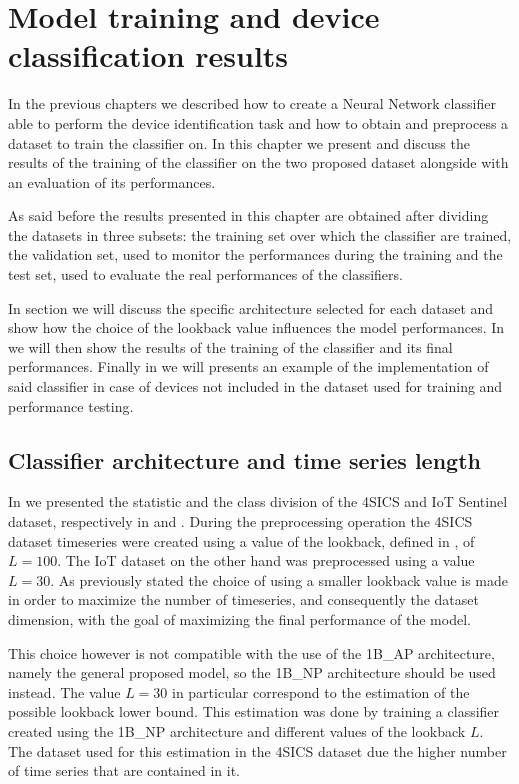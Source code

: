 \chapter{Model training and device classification results}

In the previous chapters we described how to create a Neural Network classifier able to perform the device identification task and how to obtain and preprocess a dataset to train the classifier on. In this chapter we present and discuss the results of the training of the classifier on the two proposed dataset alongside with an evaluation of its performances.

As said before the results presented in this chapter are obtained after dividing the datasets in three subsets: the training set over which the classifier are trained, the validation set, used to monitor the performances during the training and the test set, used to evaluate the real performances of the classifiers.

In section  we will discuss the specific architecture selected for each dataset and show how the choice of the lookback value influences the model performances. In  we will then show the results of the training of the classifier and its final performances. Finally in  we will presents an example of the implementation of said classifier in case of devices not included in the dataset used for training and performance testing.

\section{Classifier architecture and time series length}\label{res_lb}

In  we presented the statistic and the class division of the 4SICS and IoT Sentinel dataset, respectively in  and . During the preprocessing operation the 4SICS dataset timeseries were created using a value of the lookback, defined in , of $L=100$. The IoT dataset on the other hand was preprocessed using a value $L=30$. As previously stated the choice of using a smaller lookback value is made in order to maximize the number of timeseries, and consequently the dataset dimension, with the goal of maximizing the final performance of the model. 

This choice however is not compatible with the use of the 1B\_AP architecture, namely the general proposed model, so the 1B\_NP architecture should be used instead. The value $L=30$ in particular correspond to the estimation of the possible lookback lower bound. This estimation was done by training a classifier created using the 1B\_NP architecture and different values of the lookback $L$. The dataset used for this estimation in the 4SICS dataset due the higher number of time series that are contained in it. 

